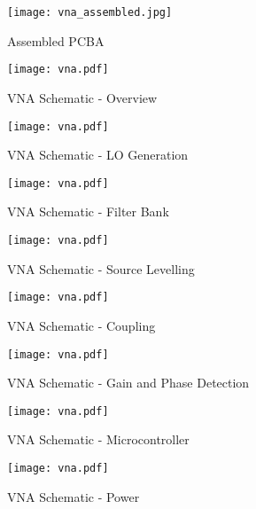\begin{landscape}
	
	\begin{figure}
		\centering
		\texttt{[image: vna\_assembled.jpg]}
		\caption{Assembled PCBA}
		\label{fig:pcb_render}
	\end{figure}

	\begin{figure}
		\centering
		\texttt{[image: vna.pdf]}
		\caption{VNA Schematic - Overview}
		\label{fig:vna_schematic_overview}
	\end{figure}

	\begin{figure}
		\centering
		\texttt{[image: vna.pdf]}
		\caption{VNA Schematic - LO Generation}
		\label{fig:vna_schematic_lo}
	\end{figure}
	
	\begin{figure}
		\centering
		\texttt{[image: vna.pdf]}
		\caption{VNA Schematic - Filter Bank}
		\label{fig:vna_schematic_filter}
	\end{figure}
	
	\begin{figure}
		\centering
		\texttt{[image: vna.pdf]}
		\caption{VNA Schematic - Source Levelling}
		\label{fig:vna_schematic_source_levelling}
	\end{figure}
	
	\begin{figure}
		\centering
		\texttt{[image: vna.pdf]}
		\caption{VNA Schematic - Coupling}
		\label{fig:vna_schematic_coupling}
	\end{figure}
	
	\begin{figure}
		\centering
		\texttt{[image: vna.pdf]}
		\caption{VNA Schematic - Gain and Phase Detection}
		\label{fig:vna_schematic_ad8302}
	\end{figure}
	
	\begin{figure}
		\centering
		\texttt{[image: vna.pdf]}
		\caption{VNA Schematic - Microcontroller}
		\label{fig:vna_schematic_micro}
	\end{figure}
	
	\begin{figure}
		\centering
		\texttt{[image: vna.pdf]}
		\caption{VNA Schematic - Power}
		\label{fig:vna_schematic_power}
	\end{figure}
\end{landscape}

